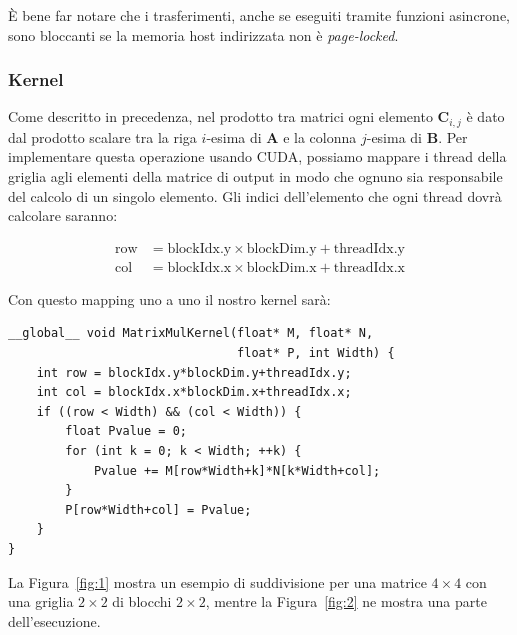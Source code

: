 \documentclass[a4paper]{article}
\begin{document}
È bene far notare che i trasferimenti, anche se eseguiti tramite funzioni asincrone, sono bloccanti se la memoria host indirizzata non è \textit{page-locked}\cite{nvidiaCUDAProgramming}.

\subsubsection{Kernel}

Come descritto in precedenza, nel prodotto tra matrici ogni elemento $\mathbf{C}_{i,j}$ è dato dal prodotto scalare tra la riga $i$-esima di $\mathbf{A}$ e la colonna $j$-esima di $\mathbf{B}$. Per implementare questa operazione usando CUDA, possiamo mappare i thread della griglia agli elementi della matrice di output in modo che ognuno sia responsabile del calcolo di un singolo elemento. Gli indici dell'elemento che ogni thread dovrà calcolare saranno:

\[
    \begin{aligned}
        \text{row} & = \text{blockIdx.y} \times \text{blockDim.y} + \text{threadIdx.y} \\
        \text{col} & = \text{blockIdx.x} \times \text{blockDim.x} + \text{threadIdx.x}
    \end{aligned}
\]

Con questo mapping uno a uno il nostro kernel sarà:

\begin{lstlisting}[caption={Kernel CUDA con memoria globale}, label={lst:1}]
__global__ void MatrixMulKernel(float* M, float* N,
                                float* P, int Width) {
    int row = blockIdx.y*blockDim.y+threadIdx.y;
    int col = blockIdx.x*blockDim.x+threadIdx.x;
    if ((row < Width) && (col < Width)) {
        float Pvalue = 0;
        for (int k = 0; k < Width; ++k) {
            Pvalue += M[row*Width+k]*N[k*Width+col];
        }
        P[row*Width+col] = Pvalue;
    }
}
\end{lstlisting}

\newpage

La Figura~\ref{fig:1} mostra un esempio di suddivisione per una matrice ${4\times{4}}$ con una griglia $2\times{2}$ di blocchi $2\times{2}$, mentre la Figura~\ref{fig:2} ne mostra una parte dell'esecuzione.
\end{document}
